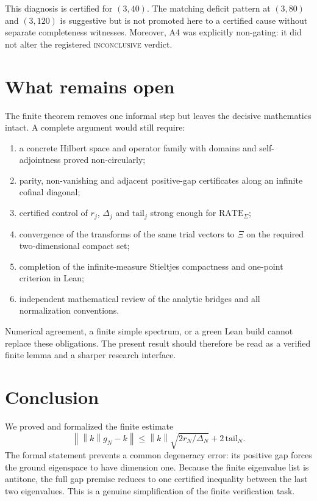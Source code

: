 \documentclass[11pt]{article}
\theoremstyle{definition}
\newcommand{\norm}[1]{\left\lVert #1\right\rVert}
\begin{document}
This diagnosis is certified for $(3,40)$.  The matching deficit pattern at
$(3,80)$ and $(3,120)$ is suggestive but is not promoted here to a certified
cause without separate completeness witnesses.  Moreover, A4 was explicitly
non-gating: it did not alter the registered \textsc{inconclusive} verdict.

\section{What remains open}

The finite theorem removes one informal step but leaves the decisive
mathematics intact.  A complete argument would still require:
\begin{enumerate}[label=(\arabic*)]
  \item a concrete Hilbert space and operator family with domains and
  self-adjointness proved non-circularly;
  \item parity, non-vanishing and adjacent positive-gap certificates along an
  infinite cofinal diagonal;
  \item certified control of $r_j$, $\Delta_j$ and $\mathrm{tail}_j$ strong
  enough for $\mathrm{RATE}_{\Sigma}$;
  \item convergence of the transforms of the same trial vectors to $\Xi$ on
  the required two-dimensional compact set;
  \item completion of the infinite-measure Stieltjes compactness and
  one-point criterion in Lean;
  \item independent mathematical review of the analytic bridges and all
  normalization conventions.
\end{enumerate}

Numerical agreement, a finite simple spectrum, or a green Lean build cannot
replace these obligations.  The present result should therefore be read as a
verified finite lemma and a sharper research interface.

\section{Conclusion}

We proved and formalized the finite estimate
\[
 \norm{\norm{k}g_N-k}
 \leq \norm{k}\sqrt{2r_N/\Delta_N}+2\,\mathrm{tail}_N.
\]
The formal statement prevents a common degeneracy error: its positive gap
forces the ground eigenspace to have dimension one.  Because the finite
eigenvalue list is antitone, the full gap premise reduces to one certified
inequality between the last two eigenvalues.  This is a genuine simplification
of the finite verification task.
\end{document}
